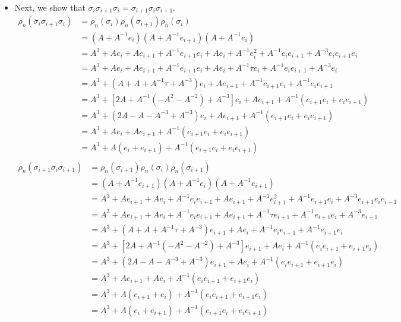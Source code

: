 \documentclass[12pt]{article}
\begin{document}
\begin{itemize}
\item Next, we show that $\sigma_i \sigma_{i + 1} \sigma_i = \sigma_{i + 1} \sigma_i \sigma_{i + 1}$. 
\begin{align*}
\rho_n(\sigma_i \sigma_{i + 1} \sigma_i) &= \rho_n (\sigma_i) \rho_n (\sigma_{i + 1}) \rho_n (\sigma_i) \\
&= (A + A^{-1} e_i) (A + A^{-1} e_{i + 1})(A + A^{-1} e_i) \\
&= A^3 + A e_i + A e_{i + 1} + A^{-1} e_{i + 1} e_i + A e_i + A^{-1} e_i^2 + A^{-1} e_i e_{i + 1} + A^{-3} e_i e_{i + 1} e_i \\
&= A^3 + A e_i + A e_{i + 1} + A^{-1} e_{i + 1} e_i + A e_i + A^{-1} \tau e_i + A^{-1} e_i e_{i + 1} + A^{-3} e_i \\
&= A^3 + (A + A + A^{-1} \tau + A^{-3}) e_i + A e_{i + 1} + A^{-1} e_{i + 1} e_i + A^{-1} e_i e_{i + 1} \\
&= A^3 + [2A + A^{-1} (-A^{2} - A^{-2}) + A^{-3}] e_i + A e_{i + 1} + A^{-1} (e_{i + 1} e_i + e_ie_{i + 1}) \\
&= A^3 + (2A - A - A^{-3} + A^{-3})e_i + A e_{i + 1} + A^{-1}(e_{i + 1} e_i + e_i e_{i + 1}) \\
&= A^3 + Ae_i + Ae_{i + 1} + A^{-1}(e_{i + 1} e_i + e_i e_{i + 1}) \\
&= A^3 + A(e_i + e_{i + 1}) + A^{-1}(e_{i + 1} e_i + e_i e_{i + 1}) \\
\end{align*}
\begin{align*}
\rho_n(\sigma_{i + 1} \sigma_{i} \sigma_{i + 1}) &= \rho_n (\sigma_{i + 1}) \rho_n (\sigma_i) \rho_n (\sigma_{i + 1}) \\
&= (A + A^{-1} e_{i + 1}) (A + A^{-1} e_{i})(A + A^{-1} e_{i + 1}) \\
&= A^3 + A e_{i + 1} + A e_{i} + A^{-1} e_{i} e_{i + 1} + A e_{i+1} + A^{-1} e_{i+1}^2 + A^{-1} e_{i+1} e_{i} + A^{-3} e_{i+1} e_{i} e_{i+1} \\
&= A^3 + A e_{i + 1} + A e_{i} + A^{-1} e_{i} e_{i + 1} + A e_{i+1} + A^{-1} \tau e_{i+1} + A^{-1} e_{i+1} e_{i} + A^{-3} e_{i+1} \\
&= A^3 + (A + A + A^{-1} \tau + A^{-3}) e_{i + 1} + A e_{i} + A^{-1} e_{i} e_{i+1} + A^{-1} e_{i+1} e_{i} \\
&= A^3 + [2A + A^{-1} (-A^{2} - A^{-2}) + A^{-3}] e_{i+1} + A e_{i} + A^{-1} (e_{i} e_{i+1} + e_{i+1} e_{i}) \\
&= A^3 + (2A - A - A^{-3} + A^{-3})e_{i+1} + A e_{i} + A^{-1} (e_{i} e_{i+1} + e_{i+1} e_{i}) \\
&= A^3 + Ae_{i + 1} + Ae_{i} + A^{-1} (e_{i} e_{i+1} + e_{i+1} e_{i}) \\
&= A^3 + A(e_{i+1} + e_{i}) + A^{-1} (e_{i} e_{i+1} + e_{i+1} e_{i}) \\
&= A^3 + A(e_i + e_{i + 1}) + A^{-1}(e_{i + 1} e_i + e_i e_{i + 1}) \\
   \end{align*}
   

\end{itemize}
\end{document}
